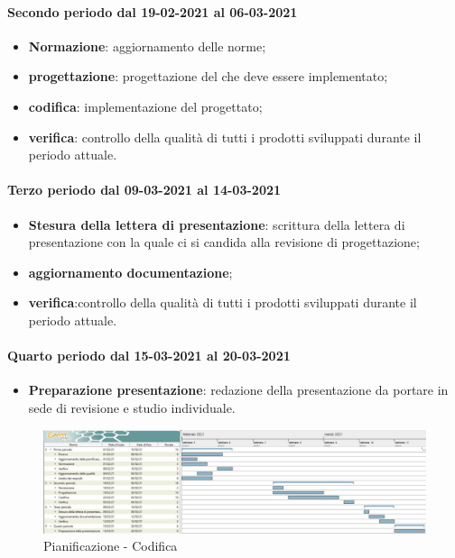 \paragraph{Secondo periodo dal 19-02-2021 al 06-03-2021}
\begin{itemize}
	\item \textbf{Normazione}: aggiornamento delle norme;
	\item \textbf{progettazione}: progettazione del  che deve essere implementato;
	\item \textbf{codifica}: implementazione del  progettato;
	\item \textbf{verifica}: controllo della qualità di tutti i prodotti sviluppati durante il periodo attuale.
\end{itemize}

\paragraph{Terzo periodo dal 09-03-2021 al 14-03-2021}
\begin{itemize}
		\item \textbf{Stesura della lettera di presentazione}: scrittura della lettera di presentazione con la quale ci
	si candida alla revisione di progettazione;
		\item \textbf{aggiornamento documentazione};
	\item \textbf{verifica}:controllo della qualità di tutti i prodotti sviluppati durante il periodo attuale.
\end{itemize}

\paragraph{Quarto periodo dal 15-03-2021 al 20-03-2021}
\begin{itemize}
	\item \textbf{Preparazione presentazione}: redazione della presentazione da portare in sede di revisione e
	studio individuale.
\end{itemize}

\newpage
\begin{landscape}
	\begin{figure}[h!]
		\includegraphics[width=24cm]{images/tb.jpg}
		\caption{Pianificazione - Codifica }
	\end{figure}
\end{landscape}
\newpage

